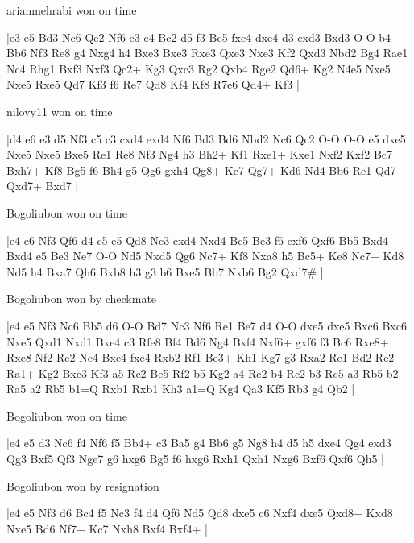 \showboard

arianmehrabi won on time

\makegametitle
|e3 e5 Bd3 Nc6 Qe2 Nf6 c3 e4 Bc2 d5 f3 Bc5 fxe4 dxe4 d3 exd3 Bxd3 O-O b4 Bb6 Nf3 Re8 g4 Nxg4 h4 Bxe3 Bxe3 Rxe3 Qxe3 Nxe3 Kf2 Qxd3 Nbd2 Bg4 Rae1 Nc4 Rhg1 Bxf3 Nxf3 Qc2+ Kg3 Qxc3 Rg2 Qxb4 Rge2 Qd6+ Kg2 N4e5 Nxe5 Nxe5 Rxe5 Qd7 Kf3 f6 Re7 Qd8 Kf4 Kf8 R7e6 Qd4+ Kf3  |

\showboard

nilovy11 won on time

\makegametitle
|d4 e6 e3 d5 Nf3 c5 c3 cxd4 exd4 Nf6 Bd3 Bd6 Nbd2 Nc6 Qc2 O-O O-O e5 dxe5 Nxe5 Nxe5 Bxe5 Re1 Re8 Nf3 Ng4 h3 Bh2+ Kf1 Rxe1+ Kxe1 Nxf2 Kxf2 Bc7 Bxh7+ Kf8 Bg5 f6 Bh4 g5 Qg6 gxh4 Qg8+ Ke7 Qg7+ Kd6 Nd4 Bb6 Re1 Qd7 Qxd7+ Bxd7  |

\showboard

Bogoliubon won on time

\makegametitle
|e4 e6 Nf3 Qf6 d4 c5 e5 Qd8 Nc3 cxd4 Nxd4 Bc5 Be3 f6 exf6 Qxf6 Bb5 Bxd4 Bxd4 e5 Be3 Ne7 O-O Nd5 Nxd5 Qg6 Nc7+ Kf8 Nxa8 h5 Bc5+ Ke8 Nc7+ Kd8 Nd5 h4 Bxa7 Qh6 Bxb8 h3 g3 b6 Bxe5 Bb7 Nxb6 Bg2 Qxd7\#  |

\showboard

Bogoliubon won by checkmate

\makegametitle
|e4 e5 Nf3 Nc6 Bb5 d6 O-O Bd7 Nc3 Nf6 Re1 Be7 d4 O-O dxe5 dxe5 Bxc6 Bxc6 Nxe5 Qxd1 Nxd1 Bxe4 c3 Rfe8 Bf4 Bd6 Ng4 Bxf4 Nxf6+ gxf6 f3 Bc6 Rxe8+ Rxe8 Nf2 Re2 Ne4 Bxe4 fxe4 Rxb2 Rf1 Be3+ Kh1 Kg7 g3 Rxa2 Re1 Bd2 Re2 Ra1+ Kg2 Bxc3 Kf3 a5 Rc2 Be5 Rf2 b5 Kg2 a4 Re2 b4 Rc2 b3 Rc5 a3 Rb5 b2 Ra5 a2 Rb5 b1=Q Rxb1 Rxb1 Kh3 a1=Q Kg4 Qa3 Kf5 Rb3 g4 Qb2  |

\showboard

Bogoliubon won on time

\makegametitle
|e4 e5 d3 Nc6 f4 Nf6 f5 Bb4+ c3 Ba5 g4 Bb6 g5 Ng8 h4 d5 h5 dxe4 Qg4 exd3 Qg3 Bxf5 Qf3 Nge7 g6 hxg6 Bg5 f6 hxg6 Rxh1 Qxh1 Nxg6 Bxf6 Qxf6 Qh5  |

\showboard

Bogoliubon won by resignation

\makegametitle
|e4 e5 Nf3 d6 Bc4 f5 Nc3 f4 d4 Qf6 Nd5 Qd8 dxe5 c6 Nxf4 dxe5 Qxd8+ Kxd8 Nxe5 Bd6 Nf7+ Kc7 Nxh8 Bxf4 Bxf4+  |


